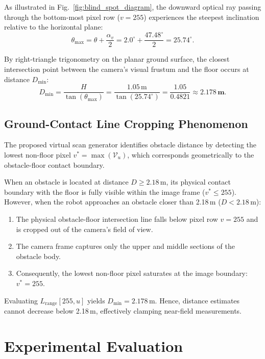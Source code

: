 \documentclass{ieeeaccess}
\begin{document}
As illustrated in Fig.~\ref{fig:blind_spot_diagram}, the downward optical ray passing through the bottom-most pixel row ($v = 255$) experiences the steepest inclination relative to the horizontal plane:
\begin{equation}
  \theta_{\max} = \theta + \frac{\alpha_v}{2} = 2.0^\circ + \frac{47.48^\circ}{2} = 25.74^\circ.
\end{equation}

By right-triangle trigonometry on the planar ground surface, the closest intersection point between the camera's visual frustum and the floor occurs at distance $D_{\min}$:
\begin{equation}
  D_{\min} = \frac{H}{\tan(\theta_{\max})} = \frac{1.05\,\text{m}}{\tan(25.74^\circ)} = \frac{1.05}{0.4821} \approx \mathbf{2.178\,\text{m}}.
  \label{eq:d_min}
\end{equation}

\subsection{Ground-Contact Line Cropping Phenomenon}
The proposed virtual scan generator identifies obstacle distance by detecting the lowest non-floor pixel $v^* = \max(\mathcal{V}_u)$, which corresponds geometrically to the obstacle-floor contact boundary. 

When an obstacle is located at distance $D \ge 2.18$\,m, its physical contact boundary with the floor is fully visible within the image frame ($v^* \le 255$). However, when the robot approaches an obstacle closer than 2.18\,m ($D < 2.18$\,m):
\begin{enumerate}
  \item The physical obstacle-floor intersection line falls below pixel row $v = 255$ and is cropped out of the camera's field of view.
  \item The camera frame captures only the upper and middle sections of the obstacle body.
  \item Consequently, the lowest non-floor pixel saturates at the image boundary: $v^* = 255$.
\end{enumerate}
Evaluating $L_{\mathrm{range}}[255, u]$ yields $D_{\min} = 2.178$\,m. Hence, distance estimates cannot decrease below 2.18\,m, effectively clamping near-field measurements.

\section{Experimental Evaluation}
\label{sec:experiments}
\end{document}

